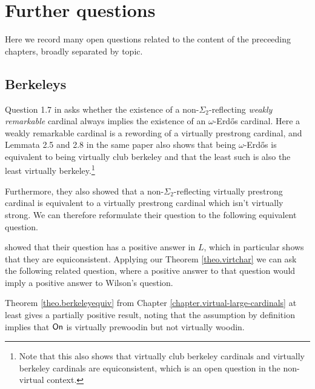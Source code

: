 \documentclass[../../main]{subfiles}
\begin{document}
\chapter{Further questions}
\thispagestyle{fancy}

Here we record many open questions related to the content of the preceeding chapters, broadly separated by topic.

\section{Berkeleys}

Question 1.7 in \cite{RemarkableWilson} asks whether the existence of a non-$\Sigma_2$-reflecting \textit{weakly remarkable} cardinal always implies the existence of an $\omega$-Erd\H os cardinal. Here a weakly remarkable cardinal is a rewording of a virtually prestrong cardinal, and Lemmata 2.5 and 2.8 in the same paper also shows that being $\omega$-Erd\H os is equivalent to being virtually club berkeley and that the least such is also the least virtually berkeley.\footnote{Note that this also shows that virtually club berkeley cardinals and virtually berkeley cardinals are equiconsistent, which is an open question in the non-virtual context.}

\qquad Furthermore, they also showed that a non-$\Sigma_2$-reflecting virtually prestrong cardinal is equivalent to a virtually prestrong cardinal which isn't virtually strong. We can therefore reformulate their question to the following equivalent question.


\cite{RemarkableWilson} showed that their question has a positive answer in $L$, which in particular shows that they are equiconsistent. Applying our Theorem \ref{theo.virtchar} we can ask the following related question, where a positive answer to that question would imply a positive answer to Wilson's question.


Theorem \ref{theo.berkeleyequiv} from Chapter \ref{chapter.virtual-large-cardinals} at least gives a partially positive result, noting that the assumption by definition implies that $\textsf{On}$ is virtually prewoodin but not virtually woodin.
\end{document}

